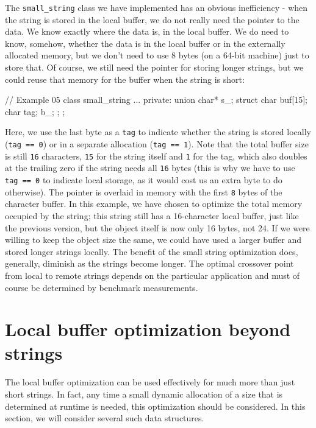 The \texttt{small\_string} class we have implemented has an obvious inefficiency - when the string is stored in the local buffer, we do not really need the pointer to the data. We know exactly where the data is, in the local buffer. We do need to know, somehow, whether the data is in the local buffer or in the externally allocated memory, but we don't need to use 8 bytes (on a 64-bit machine) just to store that. Of course, we still need the pointer for storing longer strings, but we could reuse that memory for the buffer when the string is short:

\begin{code}
// Example 05
class small_string {
  ...
  private:
  union {
    char* s_;
    struct {
      char buf[15];
      char tag;
    } b_;
  };
};
\end{code}

Here, we use the last byte as a \texttt{tag} to indicate whether the string is stored locally (\texttt{tag\ ==\ 0}) or in a separate allocation (\texttt{tag\ ==\ 1}). Note that the total buffer size is still \texttt{16} characters, \texttt{15} for the string itself and \texttt{1} for the tag, which also doubles at the trailing zero if the string needs all \texttt{16} bytes (this is why we have to use \texttt{tag\ ==\ 0} to indicate local storage, as it would cost us an extra byte to do otherwise). The pointer is overlaid in memory with the first \texttt{8} bytes of the character buffer. In this example, we have chosen to optimize the total memory occupied by the string; this string still has a 16-character local buffer, just like the previous version, but the object itself is now only 16 bytes, not 24. If we were willing to keep the object size the same, we could have used a larger buffer and stored longer strings locally. The benefit of the small string optimization does, generally, diminish as the strings become longer. The optimal crossover point from local to remote strings depends on the particular application and must of course be determined by benchmark measurements.

\section{Local buffer optimization beyond strings}

The local buffer optimization can be used effectively for much more than just short strings. In fact, any time a small dynamic allocation of a size that is determined at runtime is needed, this optimization should be considered. In this section, we will consider several such data structures.

